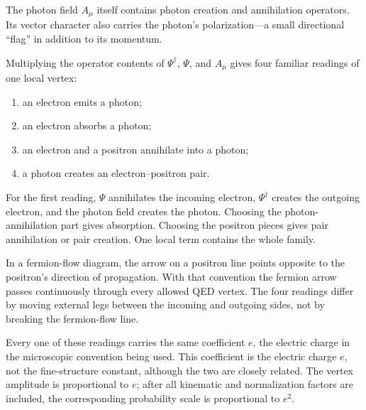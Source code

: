 The photon field \(A_\mu\) itself contains photon creation and annihilation operators. Its vector character also carries the photon's polarization---a small directional ``flag'' in addition to its momentum.

\begin{classroomqa}
\end{classroomqa}

Multiplying the operator contents of \(\Psi^\dagger\), \(\Psi\), and \(A_\mu\) gives four familiar readings of one local vertex:
\begin{enumerate}
\item an electron emits a photon;
\item an electron absorbs a photon;
\item an electron and a positron annihilate into a photon;
\item a photon creates an electron--positron pair.
\end{enumerate}
For the first reading, \(\Psi\) annihilates the incoming electron, \(\Psi^\dagger\) creates the outgoing electron, and the photon field creates the photon. Choosing the photon-annihilation part gives absorption. Choosing the positron pieces gives pair annihilation or pair creation. One local term contains the whole family.

In a fermion-flow diagram, the arrow on a positron line points opposite to the positron's direction of propagation. With that convention the fermion arrow passes continuously through every allowed QED vertex. The four readings differ by moving external legs between the incoming and outgoing sides, not by breaking the fermion-flow line.

Every one of these readings carries the same coefficient \(e\), the electric charge in the microscopic convention being used. This coefficient is the electric charge \(e\), not the fine-structure constant, although the two are closely related. The vertex amplitude is proportional to \(e\); after all kinematic and normalization factors are included, the corresponding probability scale is proportional to \(e^2\).

\begin{classroomqa}
\end{classroomqa}

